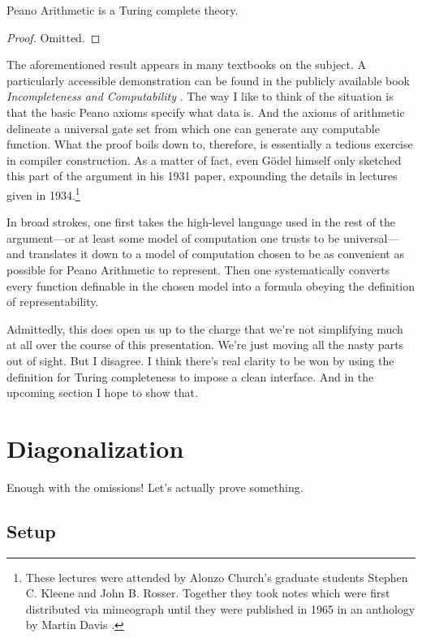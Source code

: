 \documentclass{article}
\theoremstyle{customstyle}
\newenvironment{prf}{\begin{mdframed}[skipabove=5pt, skipbelow=0pt, backgroundcolor=Gray!10, topline=false, bottomline=false, leftline=false, rightline=false]\begin{proof}}{\end{proof}\end{mdframed}}
\begin{document}
\begin{theorem}
Peano Arithmetic is a Turing complete theory.
\end{theorem}

\begin{prf}
Omitted.
\end{prf}

The aforementioned result appears in many textbooks on the subject. A particularly accessible demonstration can be found in the publicly available book \textit{Incompleteness and Computability} \cite{zach}. The way I like to think of the situation is that the basic Peano axioms specify what data is. And the axioms of arithmetic delineate a universal gate set from which one can generate any computable function.  What the proof boils down to, therefore, is essentially a tedious exercise in compiler construction. As a matter of fact, even Gödel himself only sketched this part of the argument in his 1931 paper, expounding the details in lectures given in 1934.\footnote{These lectures were attended by Alonzo Church's graduate students Stephen C. Kleene and John B. Rosser. Together they took notes which were first distributed via mimeograph until they were published in 1965 in an anthology by Martin Davis \cite{davis}.}

In broad strokes, one first takes the high-level language used in the rest of the argument---or at least some model of computation one trusts to be universal---and translates it down to a model of computation chosen to be as convenient as possible for Peano Arithmetic to represent. Then one systematically converts every function definable in the chosen model into a formula obeying the definition of representability.

Admittedly, this does open us up to the charge that we're not simplifying much at all over the course of this presentation. We're just moving all the nasty parts out of sight. But I disagree. I think there's real clarity to be won by using the definition for Turing completeness to impose a clean interface. And in the upcoming section I hope to show that.

\section{Diagonalization}

Enough with the omissions! Let's actually prove something.

\subsection{Setup}
\end{document}
